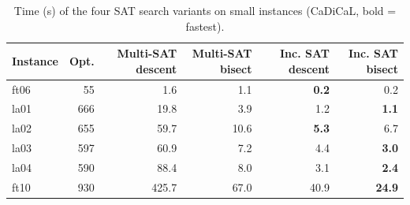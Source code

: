 \begin{table}[t]
\centering
\small
\begin{tabular}{lrrrrr}
\toprule
Instance & Opt. & Multi-SAT descent & Multi-SAT bisect & Inc. SAT descent & Inc. SAT bisect \\
\midrule
ft06 & 55 & 1.6 & 1.1 & \textbf{0.2} & 0.2 \\
la01 & 666 & 19.8 & 3.9 & 1.2 & \textbf{1.1} \\
la02 & 655 & 59.7 & 10.6 & \textbf{5.3} & 6.7 \\
la03 & 597 & 60.9 & 7.2 & 4.4 & \textbf{3.0} \\
la04 & 590 & 88.4 & 8.0 & 3.1 & \textbf{2.4} \\
ft10 & 930 & 425.7 & 67.0 & 40.9 & \textbf{24.9} \\
\bottomrule
\end{tabular}
\caption{Time (s) of the four SAT search variants on small instances (CaDiCaL, bold = fastest).}\label{tab:inc}
\end{table}
